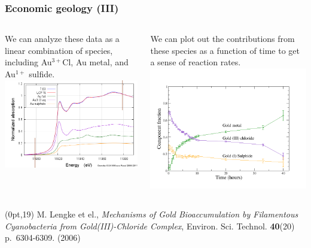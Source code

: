 \documentclass[10pt, xcolor=x11names, compress, handout]{beamer}
\begin{document}
\begin{frame}
  \frametitle{Economic geology (III)}

  \begin{columns}
    \begin{column}{0.5\linewidth}
      We can analyze these data as a linear combination of species,
      including {\color{Green4}Au$^{3+}$Cl}, {\color{Purple4}Au
        metal}, and {\color{Orange2}Au$^{1+}$ sulfide}.\\[1ex]
      \includegraphics[width=\linewidth]{xas/aucl_lcf.png}
    \end{column}
    \begin{column}{0.5\linewidth}
      We can plot out the contributions from these species as a
      function of time to get a sense of reaction rates.\\[1ex]
      \includegraphics[width=\linewidth]{xas/aucl_results.png}
    \end{column}
  \end{columns}

  \begin{textblock*}{0.5\linewidth}(0pt,19\TPVertModule) 
    \tiny
    M. Lengke et el., \textit{Mechanisms of Gold Bioaccumulation by
      Filamentous Cyanobacteria from Gold(III)-Chloride Complex},
    Environ. Sci. Technol. \textbf{40}(20) p.~6304-6309. (2006)
  \end{textblock*}
\end{frame}
\end{document}
